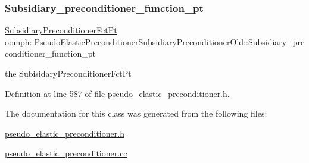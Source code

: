 \subsubsection{\texorpdfstring{Subsidiary\+\_\+preconditioner\+\_\+function\+\_\+pt}{Subsidiary\_preconditioner\_function\_pt}}
{\footnotesize\ttfamily \hyperlink{classoomph_1_1PseudoElasticPreconditionerSubsidiaryPreconditionerOld_a2ee5b7ddad26a4eb6662e2b701ab0a52}{Subsidiary\+Preconditioner\+Fct\+Pt} oomph\+::\+Pseudo\+Elastic\+Preconditioner\+Subsidiary\+Preconditioner\+Old\+::\+Subsidiary\+\_\+preconditioner\+\_\+function\+\_\+pt\hspace{0.3cm}{\ttfamily [private]}}



the Subisidary\+Preconditioner\+Fct\+Pt 



Definition at line 587 of file pseudo\+\_\+elastic\+\_\+preconditioner.\+h.



The documentation for this class was generated from the following files\+:\begin{DoxyCompactItemize}
\item 
\hyperlink{pseudo__elastic__preconditioner_8h}{pseudo\+\_\+elastic\+\_\+preconditioner.\+h}\item 
\hyperlink{pseudo__elastic__preconditioner_8cc}{pseudo\+\_\+elastic\+\_\+preconditioner.\+cc}\end{DoxyCompactItemize}
